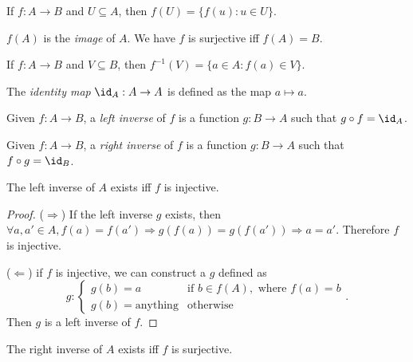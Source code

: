 \documentclass[a4paper]{article}
\begin{document}
  \begin{defi}
    If $f: A\to B$ and $U\subseteq A$, then $f(U) = \{f(u):u\in U\}$.

    $f(A)$ is the \emph{image} of $A$. We have $f$ is surjective iff $f(A) = B$.
  \end{defi}

  \begin{defi}
    If $f: A\to B$ and $V\subseteq B$, then $f^{-1}(V) = \{a\in A: f(a)\in V\}$.
  \end{defi}

  \begin{defi}
    The \emph{identity map} $\id _A: A\to A$ is defined as the map $a\mapsto a$.
  \end{defi}

  \begin{defi}
    Given $f: A\to B$, a \emph{left inverse} of $f$ is a function $g:B\to A$ such that $g\circ f = \id _A$.
  \end{defi}

  \begin{defi}
    Given $f: A\to B$, a \emph{right inverse} of $f$ is a function $g:B\to A$ such that $f\circ g = \id _B$.
  \end{defi}

  \begin{thm}
    The left inverse of $A$ exists iff $f$ is injective.
  \end{thm}

  \begin{proof}
    ($\Rightarrow$)
    If the left inverse $g$ exists, then $\forall a, a'\in A, f(a) = f(a') \Rightarrow g(  f(a))=g(f(a'))\Rightarrow a=a'$. Therefore $f$ is injective.

    ($\Leftarrow$) if $f$ is injective, we can construct a $g$ defined as
    \[
      g: \begin{cases}
        g(b) = a &\text{if }b\in f(A), \text{ where }f(a) = b\\
        g(b) = \text{anything} & \text{otherwise}
      \end{cases}.
    \]
    Then $g$ is a left inverse of $f$.
  \end{proof}

  \begin{thm}
    The right inverse of $A$ exists iff $f$ is surjective.
  \end{thm}
\end{document}
